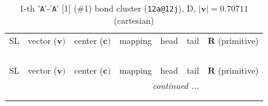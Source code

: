 \documentclass[fleqn,10pt,landscape]{jsarticle}
\begin{document}
\renewcommand{\arraystretch}{1.6}
\begin{longtable}[l]{cllllll}
\captionsetup{justification=raggedright, singlelinecheck=off}
\caption{1-th '\texttt{A}'-'\texttt{A}' [1] (\#1) bond cluster (\texttt{12a@12j}), D, $|\bm{v}|=0.70711$ (cartesian)}
 \\
 \hline \hline
SL & vector ($\bm{v})$ & center ($\bm{c})$ & mapping & head & tail & $\bm{R}$ (primitive) \\ \hline \endfirsthead

\multicolumn{6}{l}{\tablename\ \thetable{}} \\
 \hline \hline
SL & vector ($\bm{v})$ & center ($\bm{c})$ & mapping & head & tail & $\bm{R}$ (primitive) \\ \hline \endhead

 \hline \hline
\multicolumn{6}{r}{\footnotesize\it continued ...} \\ \endfoot

 \hline \hline
\multicolumn{6}{r}{} \\ \endlastfoot


\end{longtable}
\end{document}
